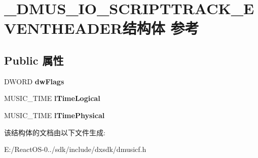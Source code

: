 \hypertarget{struct___d_m_u_s___i_o___s_c_r_i_p_t_t_r_a_c_k___e_v_e_n_t_h_e_a_d_e_r}{}\section{\+\_\+\+D\+M\+U\+S\+\_\+\+I\+O\+\_\+\+S\+C\+R\+I\+P\+T\+T\+R\+A\+C\+K\+\_\+\+E\+V\+E\+N\+T\+H\+E\+A\+D\+E\+R结构体 参考}
\label{struct___d_m_u_s___i_o___s_c_r_i_p_t_t_r_a_c_k___e_v_e_n_t_h_e_a_d_e_r}
\subsection*{Public 属性}
\begin{DoxyCompactItemize}
\item 
\mbox{\label{struct___d_m_u_s___i_o___s_c_r_i_p_t_t_r_a_c_k___e_v_e_n_t_h_e_a_d_e_r_ad2eb22c650b23ffb815b5f062b34eb3f}} 
D\+W\+O\+RD {\bfseries dw\+Flags}
\item 
\mbox{\label{struct___d_m_u_s___i_o___s_c_r_i_p_t_t_r_a_c_k___e_v_e_n_t_h_e_a_d_e_r_abbff32b8b1113182de47a43379847a16}} 
M\+U\+S\+I\+C\+\_\+\+T\+I\+ME {\bfseries l\+Time\+Logical}
\item 
\mbox{\label{struct___d_m_u_s___i_o___s_c_r_i_p_t_t_r_a_c_k___e_v_e_n_t_h_e_a_d_e_r_aa8edec5012f62e336d9272bd0e4a2e62}} 
M\+U\+S\+I\+C\+\_\+\+T\+I\+ME {\bfseries l\+Time\+Physical}
\end{DoxyCompactItemize}


该结构体的文档由以下文件生成\+:\begin{DoxyCompactItemize}
\item 
E\+:/\+React\+O\+S-\/0../sdk/include/dxsdk/dmusicf.\+h\end{DoxyCompactItemize}
